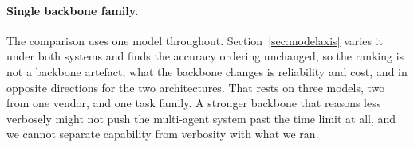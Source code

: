 \paragraph{Single backbone family.} The comparison uses one model throughout.
Section~\ref{sec:modelaxis} varies it under both systems and finds the accuracy
ordering unchanged, so the ranking is not a backbone artefact; what the backbone
changes is reliability and cost, and in opposite directions for the two
architectures. That rests on three models, two from one vendor, and one task
family. A stronger backbone that reasons less verbosely might not push the
multi-agent system past the time limit at all, and we cannot separate capability
from verbosity with what we ran.
